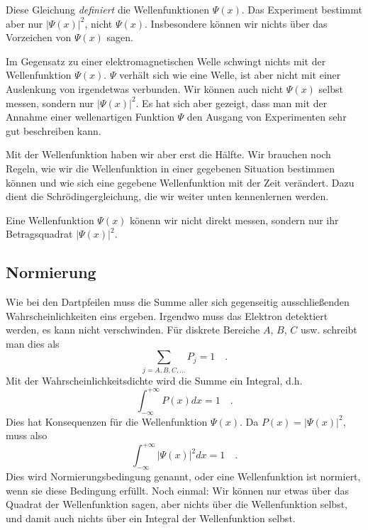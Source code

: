 Diese Gleichung \emph{definiert} die Wellenfunktionen $\Psi(x)$. Das Experiment bestimmt aber nur $|\Psi(x)|^2$, nicht $\Psi(x)$. Insbesondere können wir nichts über das Vorzeichen von $\Psi(x)$ sagen.

Im Gegensatz zu einer elektromagnetischen Welle schwingt nichts mit der Wellenfunktion $\Psi(x)$.  $\Psi$ verhält sich wie eine Welle, ist aber nicht mit einer Auslenkung von irgendetwas verbunden. Wir können auch nicht $\Psi(x)$ selbst messen, sondern nur $|\Psi(x)|^2$. Es hat sich aber gezeigt, dass man mit der Annahme einer wellenartigen Funktion $\Psi$ den Ausgang von Experimenten sehr gut beschreiben kann. 

Mit der Wellenfunktion haben wir aber erst die Hälfte. Wir brauchen noch Regeln, wie wir die Wellenfunktion in einer gegebenen Situation bestimmen können und wie sich eine gegebene Wellenfunktion mit der Zeit verändert. Dazu dient die Schrödingergleichung, die wir weiter unten kennenlernen werden.

\begin{marginfigure}
    \caption{Eine Wellenfunktion $\Psi(x)$ könenn wir nicht direkt messen, sondern nur ihr Betragsquadrat $|\Psi(x)|^2$.}
\end{marginfigure}



\subsection{Normierung}

Wie bei den Dartpfeilen muss die Summe aller sich gegenseitig ausschließenden Wahrscheinlichkeiten eins ergeben. Irgendwo muss das Elektron detektiert werden, es kann nicht verschwinden. Für diskrete Bereiche $A$, $B$, $C$ usw. schreibt man dies als
\begin{equation}
    \sum_{j = A, B, C, \dots} P_j = 1 \quad .
\end{equation}
Mit der Wahrscheinlichkeitsdichte wird die Summe ein Integral, d.h.
\begin{equation}
    \int_{-\infty}^{+\infty} P(x) dx = 1 \quad .
\end{equation}
Dies hat Konsequenzen für die Wellenfunktion $\Psi(x)$. Da $P(x) = |\Psi(x)|^2$, muss also 
\begin{equation}
    \int_{-\infty}^{+\infty} |\Psi(x)|^2 dx = 1 \quad .
\end{equation}
Dies wird Normierungsbedingung genannt, oder eine Wellenfunktion ist normiert, wenn sie diese Bedingung erfüllt. Noch einmal: Wir können nur etwas über das Quadrat der Wellenfunktion sagen, aber nichts über die Wellenfunktion selbst, und damit auch nichts über ein Integral der Wellenfunktion selbst.

